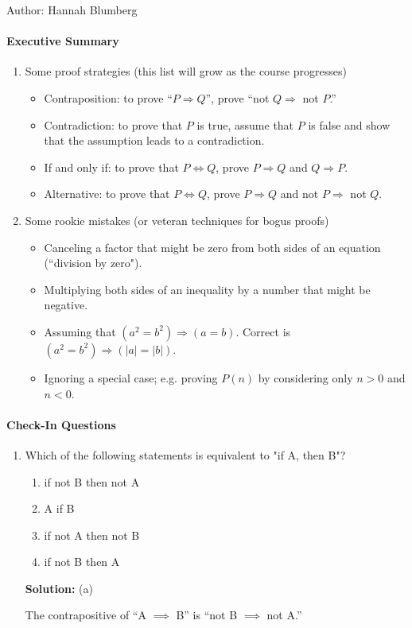 \documentclass[solution, letterpaper]{cs20inclass}
\begin{document}

\noindent Author: Hannah Blumberg%

\paragraph*{Executive Summary}
\begin{enumerate}


\item Some proof strategies (this list will grow as the course progresses)
\begin{itemize}
\item Contraposition: to prove ``$P \Rightarrow Q$'', prove ``not $Q \Rightarrow$ not $P$.''
\item Contradiction: to prove that $P$ is true, assume that $P$ is false and show that the assumption leads to a contradiction.
\item If and only if: to prove that $P \Leftrightarrow Q$, prove $P\Rightarrow Q$ and $Q\Rightarrow P$.
\item Alternative: to prove that $P \Leftrightarrow Q$, prove $P \Rightarrow Q$ and not $P \Rightarrow$ not $Q$.
\end{itemize}

\item Some rookie mistakes (or veteran techniques for bogus proofs)
\begin{itemize}
\item Canceling a factor that might be zero from both sides of an equation (``division by zero").
\item Multiplying both sides of an inequality by a number that might be negative.
\item Assuming that $(a^2 = b^2) \Rightarrow (a = b)$. Correct is  $(a^2 = b^2) \Rightarrow (|a| = |b|)$.
\item Ignoring a special case; e.g. proving $P(n)$ by considering only $n > 0$ and $n <0$.
\end{itemize}


\end{enumerate}

\paragraph*{Check-In Questions}
\begin{enumerate}
\item Which of the following statements is equivalent to "if A, then B"?
\begin{enumerate}
\item	if not B then not A
\item	A if B
\item	if not A then not B
\item	if not B then A
\end{enumerate}

\textbf{Solution:} (a)

The contrapositive of ``A $\implies$ B'' is ``not B $\implies$ not A.''

\end{enumerate}
\end{document}
